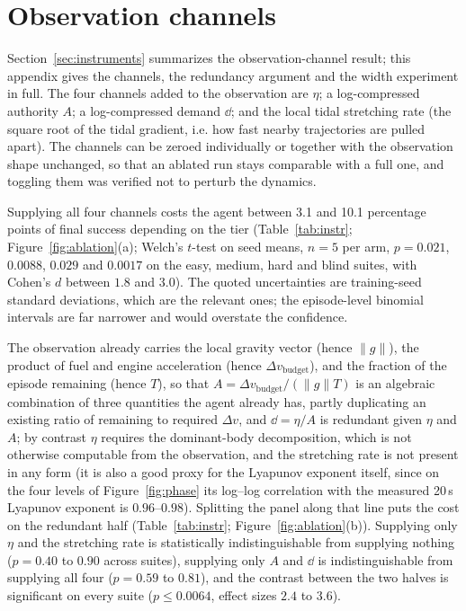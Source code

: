 \section{Observation channels}
\label{app:channels}

Section~\ref{sec:instruments} summarizes the observation-channel result;
this appendix gives the channels, the redundancy argument and the width
experiment in full. The four channels added to the observation are $\eta$; a log-compressed authority $A$; a log-compressed
demand $\dd$; and the local tidal stretching rate (the square root of the
tidal gradient, i.e. how fast nearby trajectories are pulled apart). The
channels can be zeroed individually or together with the observation shape
unchanged, so that an ablated run stays comparable with a full one, and
toggling them was verified not to perturb the dynamics.

Supplying all four channels costs the agent between 3.1 and 10.1 percentage
points of final success depending on the tier (Table~\ref{tab:instr};
Figure~\ref{fig:ablation}(a); Welch's $t$-test on seed means, $n = 5$ per
arm, $p = 0.021$, $0.0088$, $0.029$ and $0.0017$ on the easy, medium, hard
and blind suites, with Cohen's $d$ between $1.8$ and $3.0$). The quoted
uncertainties are training-seed standard deviations, which are the relevant
ones; the episode-level binomial intervals are far narrower and would
overstate the confidence.

The observation already carries the local gravity vector (hence
$\lVert g \rVert$), the product of fuel and engine acceleration (hence
$\Delta v_{\mathrm{budget}}$), and the fraction of the episode remaining
(hence $T$), so that $A = \Delta v_{\mathrm{budget}} / (\lVert g \rVert T)$ is
an algebraic combination of three quantities the agent already has, partly
duplicating an existing ratio of remaining to required $\Delta v$, and
$\dd = \eta / A$ is redundant given $\eta$ and $A$; by contrast $\eta$
requires the dominant-body decomposition, which is not otherwise computable
from the observation, and the stretching rate is not present in any form
(it is also a good proxy for the Lyapunov exponent itself, since on
the four levels of Figure~\ref{fig:phase} its log–log correlation with the
measured 20\,s Lyapunov exponent is $0.96$--$0.98$).
Splitting the panel along that line puts the cost on the redundant
half (Table~\ref{tab:instr}; Figure~\ref{fig:ablation}(b)). Supplying only
$\eta$ and the stretching rate is statistically indistinguishable from
supplying nothing ($p = 0.40$ to $0.90$ across suites), supplying only $A$
and $\dd$ is indistinguishable from supplying all four ($p = 0.59$ to
$0.81$), and the contrast between the two halves is significant on every
suite ($p \le 0.0064$, effect sizes $2.4$ to $3.6$).




